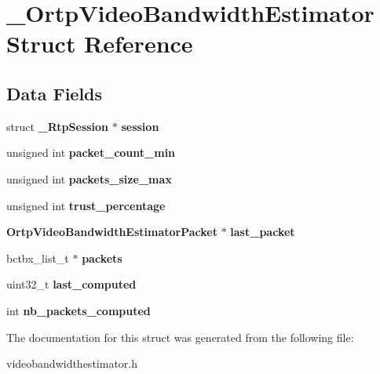 \section{\+\_\+\+Ortp\+Video\+Bandwidth\+Estimator Struct Reference}
\label{struct__OrtpVideoBandwidthEstimator}
\subsection*{Data Fields}
\begin{DoxyCompactItemize}
\item 
\mbox{\label{struct__OrtpVideoBandwidthEstimator_a9952cec2d252697a4c2b6515102203d8}} 
struct \textbf{ \+\_\+\+Rtp\+Session} $\ast$ {\bfseries session}
\item 
\mbox{\label{struct__OrtpVideoBandwidthEstimator_ad5a6c59bd63cb6f3aeb9400fa74c4436}} 
unsigned int {\bfseries packet\+\_\+count\+\_\+min}
\item 
\mbox{\label{struct__OrtpVideoBandwidthEstimator_adb131aa3eab79928fffec47624c7c5f4}} 
unsigned int {\bfseries packets\+\_\+size\+\_\+max}
\item 
\mbox{\label{struct__OrtpVideoBandwidthEstimator_a98ad56559c51778c426f274b49da32e0}} 
unsigned int {\bfseries trust\+\_\+percentage}
\item 
\mbox{\label{struct__OrtpVideoBandwidthEstimator_a2881f89dc58d1123dfd1a3299eabee55}} 
\textbf{ Ortp\+Video\+Bandwidth\+Estimator\+Packet} $\ast$ {\bfseries last\+\_\+packet}
\item 
\mbox{\label{struct__OrtpVideoBandwidthEstimator_a290941cbd14a4aad92146a87a7c3200b}} 
bctbx\+\_\+list\+\_\+t $\ast$ {\bfseries packets}
\item 
\mbox{\label{struct__OrtpVideoBandwidthEstimator_af2256ec78af7edb324c1a3c97be5d215}} 
uint32\+\_\+t {\bfseries last\+\_\+computed}
\item 
\mbox{\label{struct__OrtpVideoBandwidthEstimator_a2a4f3f5bfe5874513aa9abd1d0683cfd}} 
int {\bfseries nb\+\_\+packets\+\_\+computed}
\end{DoxyCompactItemize}


The documentation for this struct was generated from the following file\+:\begin{DoxyCompactItemize}
\item 
videobandwidthestimator.\+h\end{DoxyCompactItemize}
